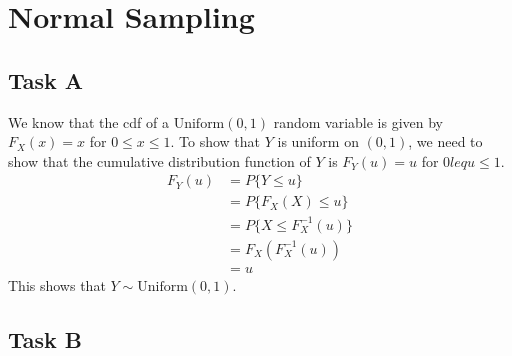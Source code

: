 \section{Normal Sampling}
\subsection*{Task A}
We know that the cdf of a $\textrm{Uniform}(0,1)$ random variable is given by $F_X(x) = x$ for $0\leq x\leq 1$.
To show that $Y$ is uniform on $(0, 1)$, we need to show that the cumulative distribution function of $Y$ is $F_Y(u) = u$ for $0 leq u \leq 1$.
\begin{align*}
	F_Y(u) & = P\{Y \leq u\}           \\
	       & = P\{F_X(X) \leq u\}      \\
	       & = P\{X \leq F_X^{-1}(u)\} \\
	       & = F_X(F_X^{-1}(u))        \\
	       & = u
\end{align*}
This shows that $Y \sim \textrm{Uniform}(0,1)$.

\subsection*{Task B}


